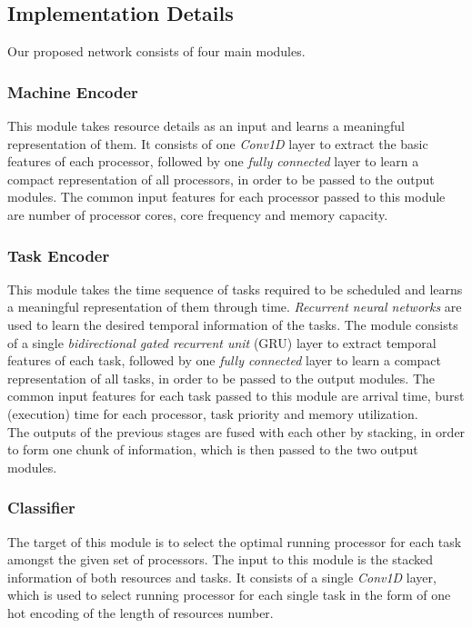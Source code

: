 \subsection{Implementation Details}
Our proposed network consists of four main modules.

\subsubsection{Machine Encoder}
This module takes resource details as an input and learns a meaningful representation of them. It consists of one \emph{Conv1D} layer to extract the basic features of each processor, followed by one \emph{fully connected} layer to learn a compact representation of all processors, in order to be passed to the output modules. The common input features for each processor passed to this module are number of processor cores, core frequency and memory capacity. \\

\subsubsection{Task Encoder}
This module takes the time sequence of tasks required to be scheduled and learns a meaningful representation of them through time. \emph{Recurrent neural networks} are used to learn the desired temporal information of the tasks. The module consists of a single \emph{bidirectional gated recurrent unit} (GRU) \cite{chung2014empirical} layer to extract temporal features of each task, followed by one \emph{fully connected} layer to learn a compact representation of all tasks, in order to be passed to the output modules. The common input features for each task passed to this module are arrival time, burst (execution) time for each processor, task priority and memory utilization. \\

The outputs of the previous stages are fused with each other by stacking, in order to form one chunk of information, which is then passed to the two output modules. \\

\subsubsection{Classifier}
The target of this module is to select the optimal running processor for each task amongst the given set of processors. The input to this module is the stacked information of both resources and tasks. It consists of a single \emph{Conv1D} layer, which is used to select running processor for each single task in the form of one hot encoding of the length of resources number. \\

